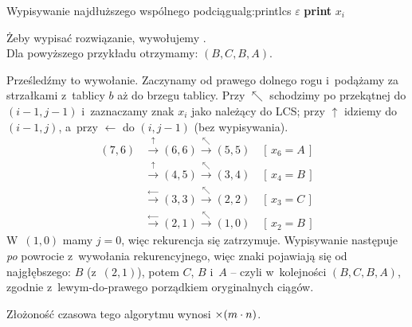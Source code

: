 \begin{alg}{Wypisywanie najdłuższego wspólnego podciągu}{alg:printlcs}
	\State \Return $\varepsilon$ 
	\EndIf
	\State {}
	\State \textbf{print} $x_i$
	\State {}
	\Else
	\State {}
	\EndIf
	\EndFunction
\end{alg}

Żeby wypisać rozwiązanie, wywołujemy . \\
Dla powyższego przykładu otrzymamy: $(B, C, B, A)$.

\begin{dygresja}
	Prześledźmy to wywołanie. Zaczynamy od prawego dolnego rogu i~podążamy za
	strzałkami z~tablicy $b$ aż do brzegu tablicy. Przy $\nwarrow$ schodzimy po
	przekątnej do $(i - 1, j - 1)$ i~zaznaczamy znak $x_i$ jako należący do LCS;
	przy $\uparrow$ idziemy do $(i - 1, j)$, a~przy $\leftarrow$ do $(i, j - 1)$
	(bez wypisywania).
	\begin{align*}
		(7, 6) &\xrightarrow{\uparrow}     (6, 6)
		        \xrightarrow{\nwarrow}      (5, 5) \quad[\,x_6 = A\,] \\
		       &\xrightarrow{\uparrow}      (4, 5)
		        \xrightarrow{\nwarrow}      (3, 4) \quad[\,x_4 = B\,] \\
		       &\xrightarrow{\leftarrow}    (3, 3)
		        \xrightarrow{\nwarrow}      (2, 2) \quad[\,x_3 = C\,] \\
		       &\xrightarrow{\leftarrow}    (2, 1)
		        \xrightarrow{\nwarrow}      (1, 0) \quad[\,x_2 = B\,]
	\end{align*}
	W~$(1, 0)$ mamy $j = 0$, więc rekurencja się zatrzymuje. Wypisywanie następuje
	\emph{po} powrocie z~wywołania rekurencyjnego, więc znaki pojawiają się od
	najgłębszego: $B$ (z~$(2,1)$), potem $C$, $B$ i~$A$ -- czyli w~kolejności
	$(B, C, B, A)$, zgodnie z~lewym-do-prawego porządkiem oryginalnych ciągów.
\end{dygresja}

Złożoność czasowa tego algorytmu wynosi $\mathcal{\Theta}(m \cdot n)$.
